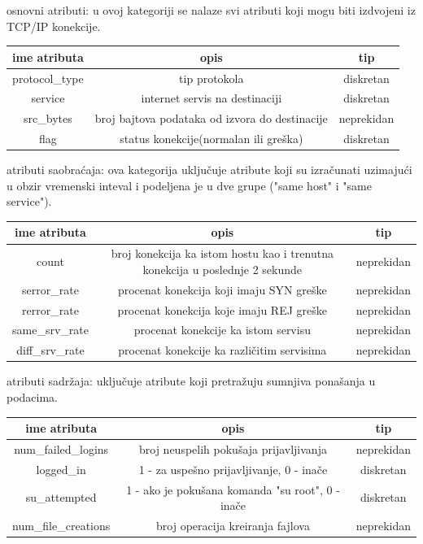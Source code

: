 \documentclass[10pt]{article}
\begin{document}
\begin{enumerate}
\item osnovni atributi: u ovoj kategoriji se nalaze svi atributi koji mogu biti izdvojeni iz TCP/IP konekcije.

\begin{tabular}{ |c|c|c| } 
 \hline
 ime atributa & opis & tip\\
 \hline
 protocol\_type & tip protokola & diskretan\\
 \hline
 service & internet servis na destinaciji & diskretan\\
 \hline
 src\_bytes & broj bajtova podataka od izvora do destinacije & neprekidan\\
 \hline
 flag & status konekcije(normalan ili gre\v ska) & diskretan\\
 \hline
\end{tabular}
\item atributi saobra\'caja: ova kategorija uklju\v cuje atribute koji su izra\v cunati uzimaju\' ci u obzir vremenski inteval i podeljena je u dve grupe ("same host" i  "same service").

\footnotesize{
\begin{tabular}{ |c|c|c| }
\hline
ime atributa & opis & tip\\
\hline
count & broj konekcija ka istom hostu kao i trenutna konekcija u poslednje 2 sekunde & neprekidan\\
\hline
serror\_rate & procenat konekcija koji imaju SYN gre\v ske & neprekidan\\
\hline
rerror\_rate & procenat konekcija koje imaju REJ gre\v ske & neprekidan\\
\hline
same\_srv\_rate & procenat konekcije ka istom servisu & neprekidan\\
\hline
diff\_srv\_rate & procenat konekcije ka razli\v citim servisima & neprekidan\\
\hline
\end{tabular}
}

\normalsize{
\item atributi sadr\v zaja: uklju\v cuje atribute koji pretra\v zuju sumnjiva pona\v sanja u podacima.}

\begin{tabular}{ |c|c|c| }
\hline
ime atributa & opis & tip\\
\hline
num\_failed\_logins & broj neuspelih poku\v saja prijavljivanja & neprekidan\\
\hline
logged\_in & 1 - za uspe\v sno prijavljivanje, 0 - ina\v ce & diskretan\\
\hline
su\_attempted & 1 - ako je poku\v sana komanda "su root", 0 - ina\v ce & diskretan\\
\hline
num\_file\_creations & broj operacija kreiranja fajlova & neprekidan\\
\hline

\end{tabular}

\end{enumerate}
\end{document}
